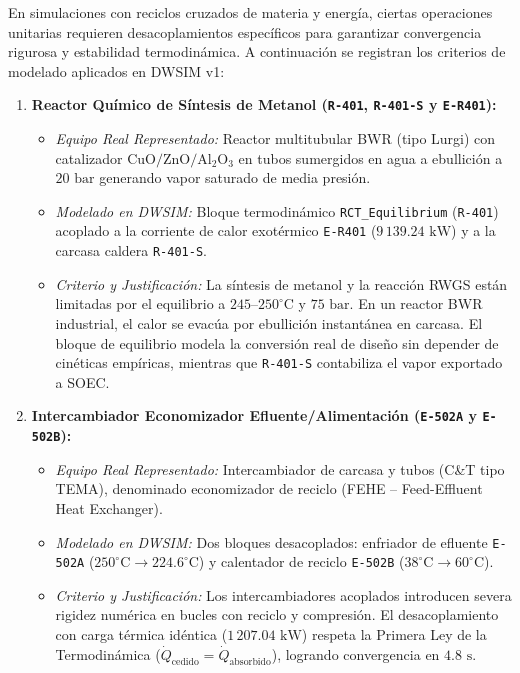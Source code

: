 \documentclass[11pt,letterpaper]{article}
\begin{document}
En simulaciones con reciclos cruzados de materia y energía, ciertas operaciones unitarias requieren desacoplamientos específicos para garantizar convergencia rigurosa y estabilidad termodinámica. A continuación se registran los criterios de modelado aplicados en DWSIM v1:

\begin{enumerate}[leftmargin=1.1em,itemsep=1.0pt,parsep=0pt,topsep=1pt]
    \item \textbf{Reactor Químico de Síntesis de Metanol (\texttt{R-401}, \texttt{R-401-S} y \texttt{E-R401}):}
    \begin{itemize}[leftmargin=0.9em,itemsep=0pt,parsep=0pt,topsep=0.5pt]
        \item \textit{Equipo Real Representado:} Reactor multitubular BWR (tipo Lurgi) con catalizador $\text{CuO}/\text{ZnO}/\text{Al}_2\text{O}_3$ en tubos sumergidos en agua a ebullición a $20\text{ bar}$ generando vapor saturado de media presión.
        \item \textit{Modelado en DWSIM:} Bloque termodinámico \texttt{RCT\_Equilibrium} (\texttt{R-401}) acoplado a la corriente de calor exotérmico \texttt{E-R401} ($9\,139.24\text{ kW}$) y a la carcasa caldera \texttt{R-401-S}.
        \item \textit{Criterio y Justificación:} La síntesis de metanol y la reacción RWGS están limitadas por el equilibrio a $245\text{--}250^\circ\text{C}$ y $75\text{ bar}$. En un reactor BWR industrial, el calor se evacúa por ebullición instantánea en carcasa. El bloque de equilibrio modela la conversión real de diseño sin depender de cinéticas empíricas, mientras que \texttt{R-401-S} contabiliza el vapor exportado a SOEC.
    \end{itemize}

    \item \textbf{Intercambiador Economizador Efluente/Alimentación (\texttt{E-502A} y \texttt{E-502B}):}
    \begin{itemize}[leftmargin=0.9em,itemsep=0pt,parsep=0pt,topsep=0.5pt]
        \item \textit{Equipo Real Representado:} Intercambiador de carcasa y tubos (C\&T tipo TEMA), denominado economizador de reciclo (FEHE -- Feed-Effluent Heat Exchanger).
        \item \textit{Modelado en DWSIM:} Dos bloques desacoplados: enfriador de efluente \texttt{E-502A} ($250^\circ\text{C} \to 224.6^\circ\text{C}$) y calentador de reciclo \texttt{E-502B} ($38^\circ\text{C} \to 60^\circ\text{C}$).
        \item \textit{Criterio y Justificación:} Los intercambiadores acoplados introducen severa rigidez numérica en bucles con reciclo y compresión. El desacoplamiento con carga térmica idéntica ($1\,207.04\text{ kW}$) respeta la Primera Ley de la Termodinámica ($\dot{Q}_{\text{cedido}} = \dot{Q}_{\text{absorbido}}$), logrando convergencia en $4.8\text{ s}$.
    \end{itemize}


\end{enumerate}
\end{document}
